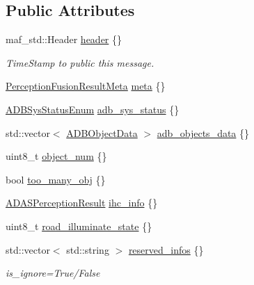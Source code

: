\subsection*{Public Attributes}
\begin{DoxyCompactItemize}
\item 
maf\+\_\+std\+::\+Header \hyperlink{structmaf__perception__interface_1_1ADBInfo_a7f6420fe4affa345c9e90b58c94819ef}{header} \{\}
\begin{DoxyCompactList}\small\item\em Time\+Stamp to public this message. \end{DoxyCompactList}\item 
\hyperlink{structmaf__perception__interface_1_1PerceptionFusionResultMeta}{Perception\+Fusion\+Result\+Meta} \hyperlink{structmaf__perception__interface_1_1ADBInfo_aa6a3f669e9659d5e95bf6c06853c23be}{meta} \{\}
\item 
\hyperlink{structmaf__perception__interface_1_1ADBSysStatusEnum}{A\+D\+B\+Sys\+Status\+Enum} \hyperlink{structmaf__perception__interface_1_1ADBInfo_adb00ac0bd57ff237075e630484e3cf2f}{adb\+\_\+sys\+\_\+status} \{\}
\item 
std\+::vector$<$ \hyperlink{structmaf__perception__interface_1_1ADBObjectData}{A\+D\+B\+Object\+Data} $>$ \hyperlink{structmaf__perception__interface_1_1ADBInfo_a87e966ece8cd1b62cb401756a0394609}{adb\+\_\+objects\+\_\+data} \{\}
\item 
uint8\+\_\+t \hyperlink{structmaf__perception__interface_1_1ADBInfo_a88c37fbc800317c406f1243c55ce5fd1}{object\+\_\+num} \{\}
\item 
bool \hyperlink{structmaf__perception__interface_1_1ADBInfo_a36b3019ba1e2a0e84c3d54ff7cc45236}{too\+\_\+many\+\_\+obj} \{\}
\item 
\hyperlink{structmaf__perception__interface_1_1ADASPerceptionResult}{A\+D\+A\+S\+Perception\+Result} \hyperlink{structmaf__perception__interface_1_1ADBInfo_a037ae882bea30e5770f8f9497c6e9f26}{ihc\+\_\+info} \{\}
\item 
uint8\+\_\+t \hyperlink{structmaf__perception__interface_1_1ADBInfo_a223ca9c293a5a50cb4a7b54275ec01f8}{road\+\_\+illuminate\+\_\+state} \{\}
\item 
std\+::vector$<$ std\+::string $>$ \hyperlink{structmaf__perception__interface_1_1ADBInfo_a0384e8710952fdd6ccb9381b71fce973}{reserved\+\_\+infos} \{\}
\begin{DoxyCompactList}\small\item\em is\+\_\+ignore=True/\+False \end{DoxyCompactList}\end{DoxyCompactItemize}


